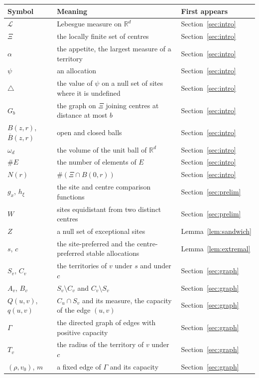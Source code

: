 \documentclass[11pt]{amsart}
\theoremstyle{remark}
\numberwithin{equation}{section}
\newcommand{\R}{\mathbb{R}}
\newcommand{\Leb}{\mathcal{L}}
\newcommand{\nodef}{\triangle}
\begin{document}
\begin{center}\small
\begin{tabular}{@{}lp{}l@{}}\toprule
Symbol & Meaning & First appears \\ \midrule
$\Leb$ & Lebesgue measure on $\R^d$ & Section~\ref{sec:intro} \\
$\Xi$ & the locally finite set of centres & Section~\ref{sec:intro} \\
$\alpha$ & the appetite, the largest measure of a territory & Section~\ref{sec:intro} \\
$\psi$ & an allocation & Section~\ref{sec:intro} \\
$\nodef$ & the value of $\psi$ on a null set of sites where it is undefined & Section~\ref{sec:intro} \\
$G_b$ & the graph on $\Xi$ joining centres at distance at most $b$ & Section~\ref{sec:intro} \\
$B(z,r)$, $\overline B(z,r)$ & open and closed balls & Section~\ref{sec:intro} \\
$\omega_d$ & the volume of the unit ball of $\R^d$ & Section~\ref{sec:intro} \\
$\#E$ & the number of elements of $E$ & Section~\ref{sec:intro} \\
$N(r)$ & $\#(\Xi\cap B(0,r))$ & Section~\ref{sec:intro} \\
$g_x$, $h_\xi$ & the site and centre comparison functions & Section~\ref{sec:prelim} \\
$W$ & sites equidistant from two distinct centres & Section~\ref{sec:prelim} \\
$Z$ & a null set of exceptional sites & Lemma~\ref{lem:sandwich} \\
$s$, $c$ & the site-preferred and the centre-preferred stable allocations & Lemma~\ref{lem:extremal} \\
$S_v$, $C_v$ & the territories of $v$ under $s$ and under $c$ & Section~\ref{sec:graph} \\
$A_v$, $B_v$ & $S_v\setminus C_v$ and $C_v\setminus S_v$ & Section~\ref{sec:graph} \\
$Q(u,v)$, $q(u,v)$ & $C_u\cap S_v$ and its measure, the capacity of the edge $(u,v)$ & Section~\ref{sec:graph} \\
$\Gamma$ & the directed graph of edges with positive capacity & Section~\ref{sec:graph} \\
$T_v$ & the radius of the territory of $v$ under $c$ & Section~\ref{sec:graph} \\
$(\rho,v_0)$, $m$ & a fixed edge of $\Gamma$ and its capacity & Section~\ref{sec:graph} \\

\end{tabular}
\end{center}
\end{document}
